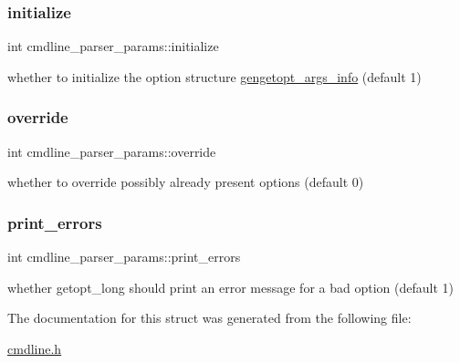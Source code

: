 \subsubsection{\texorpdfstring{initialize}{initialize}}
{\footnotesize\ttfamily int cmdline\+\_\+parser\+\_\+params\+::initialize}



whether to initialize the option structure \hyperlink{structgengetopt__args__info}{gengetopt\+\_\+args\+\_\+info} (default 1) 

\mbox{\label{structcmdline__parser__params_ad3ff9d69146e69a47506782197b5675c}} 
\subsubsection{\texorpdfstring{override}{override}}
{\footnotesize\ttfamily int cmdline\+\_\+parser\+\_\+params\+::override}



whether to override possibly already present options (default 0) 

\mbox{\label{structcmdline__parser__params_a3236f066777488e8502abe05ccd24455}} 
\subsubsection{\texorpdfstring{print\+\_\+errors}{print\_errors}}
{\footnotesize\ttfamily int cmdline\+\_\+parser\+\_\+params\+::print\+\_\+errors}



whether getopt\+\_\+long should print an error message for a bad option (default 1) 



The documentation for this struct was generated from the following file\+:\begin{DoxyCompactItemize}
\item 
\hyperlink{cmdline_8h}{cmdline.\+h}\end{DoxyCompactItemize}
